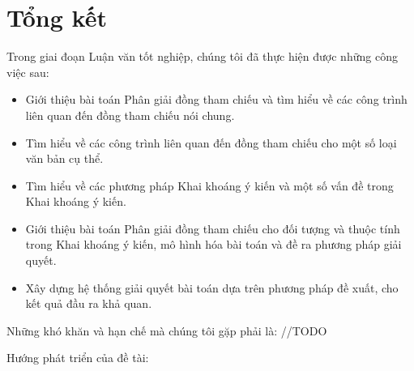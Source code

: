 \documentclass[12pt]{report}
\begin{document}
	\chapter{Tổng kết}			
		\par Trong giai đoạn Luận văn tốt nghiệp, chúng tôi đã thực hiện được những công việc sau:
		\begin{itemize}
			\item{Giới thiệu bài toán Phân giải đồng tham chiếu và tìm hiểu về các công trình liên quan đến đồng tham chiếu nói chung.}
			\item{Tìm hiểu về các công trình liên quan đến đồng tham chiếu cho một số loại văn bản cụ thể.}
			\item{Tìm hiểu về các phương pháp Khai khoáng ý kiến và một số vấn đề trong Khai khoáng ý kiến.}
			\item{Giới thiệu bài toán Phân giải đồng tham chiếu cho đối tượng và thuộc tính trong Khai khoáng ý kiến, mô hình hóa bài toán và đề ra phương pháp giải quyết.}
			\item{Xây dựng hệ thống giải quyết bài toán dựa trên phương pháp đề xuất, cho kết quả đầu ra khả quan.}
		\end{itemize}
		\par Những khó khăn và hạn chế mà chúng tôi gặp phải là:
			//TODO		
		\par Hướng phát triển của đề tài:
\end{document}
